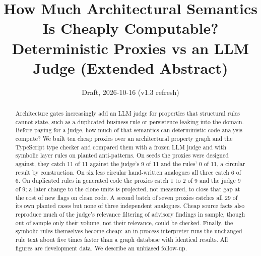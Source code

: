 \documentclass[10pt,a4paper]{article}
\title{How Much Architectural Semantics Is Cheaply Computable?\\
\large Deterministic Proxies vs an LLM Judge (Extended Abstract)}
\author{\todo{author list and affiliations}}
\date{Draft, 2026-10-16 (v1.3 refresh)}
\begin{document}
\maketitle

\begin{abstract}
Architecture gates increasingly add an LLM judge for properties that structural rules cannot state, such as a
duplicated business rule or persistence leaking into the domain. Before paying for a judge, how much of that
semantics can deterministic code analysis compute? We built ten cheap proxies over an architectural property graph
and the TypeScript type checker and compared them with a frozen LLM judge and with symbolic layer rules on planted
anti-patterns. On seeds the proxies were designed against, they catch 11 of 11 against the judge's 9 of 11 and the
rules' 0 of 11, a circular result by construction. On six less circular hand-written analogues all three catch 6 of
6. On duplicated rules in generated code the proxies catch 1 to 2 of 9 and the judge 9 of 9; a later change to
the clone units is projected, not measured, to close that gap at the cost of new flags on clean code. A second batch
of seven proxies catches all 29 of its own planted cases but none of three independent analogues. Cheap source facts
also reproduce much of the judge's relevance filtering of advisory findings in sample, though out of sample only
their volume, not their relevance, could be checked. Finally, the symbolic rules themselves become cheap: an
in-process interpreter runs the unchanged rule text about five times faster than a graph database with identical
results. All figures are development data. We describe an unbiased follow-up.
\end{abstract}
\end{document}
